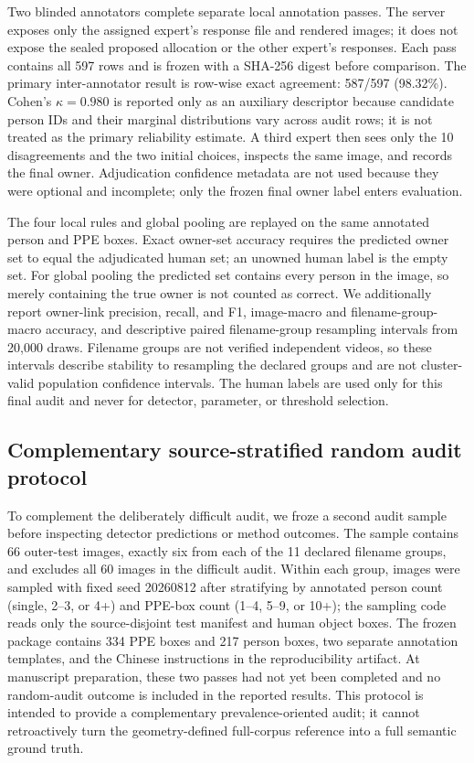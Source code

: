 \documentclass[iicol,pdflatex,sn-mathphys-num]{sn-jnl}
\begin{document}
Two blinded annotators complete separate local annotation passes. The server exposes only the assigned expert's response file and rendered images; it does not expose the sealed proposed allocation or the other expert's responses. Each pass contains all 597 rows and is frozen with a SHA-256 digest before comparison. The primary inter-annotator result is row-wise exact agreement: 587/597 (98.32\%). Cohen's $\kappa=0.980$ is reported only as an auxiliary descriptor because candidate person IDs and their marginal distributions vary across audit rows; it is not treated as the primary reliability estimate. A third expert then sees only the 10 disagreements and the two initial choices, inspects the same image, and records the final owner. Adjudication confidence metadata are not used because they were optional and incomplete; only the frozen final owner label enters evaluation.

The four local rules and global pooling are replayed on the same annotated person and PPE boxes. Exact owner-set accuracy requires the predicted owner set to equal the adjudicated human set; an unowned human label is the empty set. For global pooling the predicted set contains every person in the image, so merely containing the true owner is not counted as correct. We additionally report owner-link precision, recall, and F1, image-macro and filename-group-macro accuracy, and descriptive paired filename-group resampling intervals from 20,000 draws. Filename groups are not verified independent videos, so these intervals describe stability to resampling the declared groups and are not cluster-valid population confidence intervals. The human labels are used only for this final audit and never for detector, parameter, or threshold selection.

\subsection{Complementary source-stratified random audit protocol}
To complement the deliberately difficult audit, we froze a second audit sample before inspecting detector predictions or method outcomes. The sample contains 66 outer-test images, exactly six from each of the 11 declared filename groups, and excludes all 60 images in the difficult audit. Within each group, images were sampled with fixed seed 20260812 after stratifying by annotated person count (single, 2--3, or 4+) and PPE-box count (1--4, 5--9, or 10+); the sampling code reads only the source-disjoint test manifest and human object boxes. The frozen package contains 334 PPE boxes and 217 person boxes, two separate annotation templates, and the Chinese instructions in the reproducibility artifact. At manuscript preparation, these two passes had not yet been completed and no random-audit outcome is included in the reported results. This protocol is intended to provide a complementary prevalence-oriented audit; it cannot retroactively turn the geometry-defined full-corpus reference into a full semantic ground truth.
\end{document}
